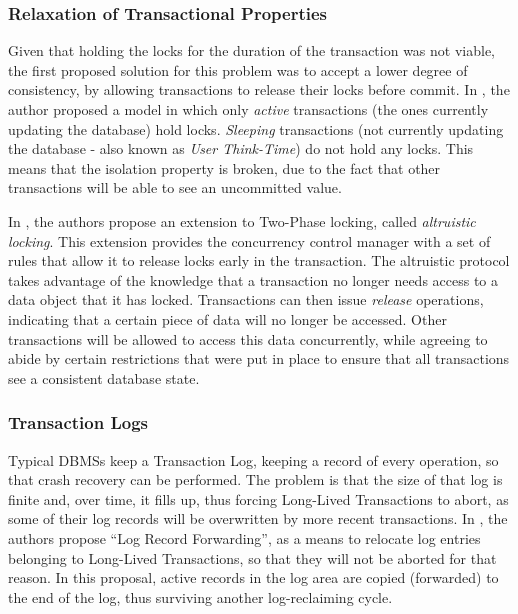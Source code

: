 \documentclass{llncs}
\begin{document}
\subsubsection{Relaxation of Transactional Properties}

Given that holding the locks for the duration of the transaction was
not viable, the first proposed solution for this problem was to accept
a lower degree of consistency, by allowing transactions to release
their locks before commit. In \cite{gray1981transaction}, the author
proposed a model in which only {\it active} transactions (the ones
currently updating the database) hold locks. {\it Sleeping}
transactions (not currently updating the database - also known as {\it
  User Think-Time}) do not hold any locks. This means that the
isolation property is broken, due to the fact that other transactions
will be able to see an uncommitted value.

In \cite{salem1989altruistic}, the authors propose an extension to
Two-Phase locking, called {\it altruistic locking}. This extension
provides the concurrency control manager with a set of rules that
allow it to release locks early in the transaction. The altruistic
protocol takes advantage of the knowledge that a transaction no longer
needs access to a data object that it has locked. Transactions can
then issue {\it release} operations, indicating that a certain piece
of data will no longer be accessed. Other transactions will be allowed
to access this data concurrently, while agreeing to abide by certain
restrictions that were put in place to ensure that all transactions
see a consistent database state.

\subsubsection{Transaction Logs}

Typical DBMSs keep a Transaction Log, keeping a record of every
operation, so that crash recovery can be performed. The problem is
that the size of that log is finite and, over time, it fills up, thus
forcing Long-Lived Transactions to abort, as some of their log records
will be overwritten by more recent transactions. In
\cite{hagmann1991implementing}, the authors propose ``Log Record
Forwarding'', as a means to relocate log entries belonging to
Long-Lived Transactions, so that they will not be aborted for that
reason. In this proposal, active records in the log area are copied
(forwarded) to the end of the log, thus surviving another
log-reclaiming cycle.
\end{document}
